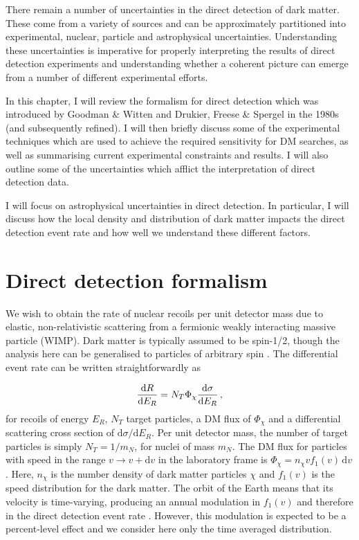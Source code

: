 There remain a number of uncertainties in the direct detection of dark matter. These come from a variety of sources and can be approximately partitioned into experimental, nuclear, particle and astrophysical uncertainties. Understanding these uncertainties is imperative for properly interpreting the results of direct detection experiments and understanding whether a coherent picture can emerge from a number of different experimental efforts.

In this chapter, I will review the formalism for direct detection which was introduced by Goodman \& Witten and Drukier, Freese \& Spergel in the 1980s (and subsequently refined). I will then briefly discuss some of the experimental techniques which are used to achieve the required sensitivity for DM searches, as well as summarising current experimental constraints and results. I will also outline some of the uncertainties which afflict the interpretation of direct detection data.

I will focus on astrophysical uncertainties in direct detection. In particular, I will discuss how the local density and distribution of dark matter impacts the direct detection event rate and how well we understand these different factors.

\section{Direct detection formalism}

We wish to obtain the rate of nuclear recoils per unit detector mass due to elastic, non-relativistic scattering from a fermionic weakly interacting massive particle (WIMP). Dark matter is typically assumed to be spin-1/2, though the analysis here can be generalised to particles of arbitrary spin \cite{Kurylov:2003}. The differential event rate can be written straightforwardly as

\begin{equation}
\frac{\mathrm{d}R}{\mathrm{d}E_R} = N_T \Phi_\chi \frac{\mathrm{d}\sigma}{\mathrm{d}E_R}\,,
\end{equation}
for recoils of energy $E_R$, $N_T$ target particles, a DM flux of $\Phi_\chi$ and a differential scattering cross section of $\mathrm{d}\sigma/\mathrm{d}E_R$. Per unit detector mass, the number of target particles is simply $N_T = 1/m_N$, for nuclei of mass $m_N$. The DM flux for particles with speed in the range $v \rightarrow v + \mathrm{d}v$ in the laboratory frame is $\Phi_\chi = n_\chi v f_1(v) \,\mathrm{d}v$. Here, $n_\chi$ is the number density of dark matter particles $\chi$ and $f_1(v)$ is the speed distribution for the dark matter. The orbit of the Earth means that its velocity is time-varying, producing an annual modulation in $f_1(v)$ and therefore in the direct detection event rate \cite{Freese:1988}. However, this modulation is expected to be a percent-level effect and we consider here only the time averaged distribution.

